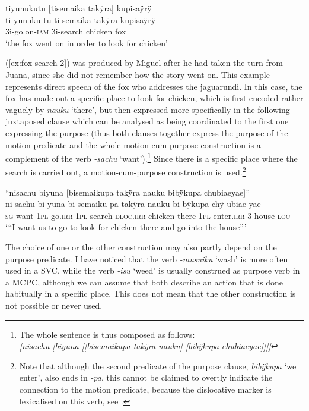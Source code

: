 \ea\label{ex:fox-search-1}
\begingl
\glpreamble tiyunukutu \textup{[}tisemaika takÿra\textup{]} kupisaÿrÿ\\
\gla ti-yunuku-tu ti-semaika takÿra kupisaÿrÿ\\
\glb 3i-go.on-\textsc{iam} 3i-search chicken fox\\
\glft ‘the fox went on in order to look for chicken’
\endgl
\trailingcitation{[jmx-n120429ls-x5.300]}
\xe

(\ref{ex:fox-search-2}) was produced by Miguel after he had taken the turn from Juana, since she did not remember how the story went on. This example represents direct speech of the fox who addresses the jaguarundi. In this case, the fox has made out a specific place to look for chicken, which is first encoded rather vaguely by \textit{nauku} ‘there’, but then expressed more specifically in the following juxtaposed clause which can be analysed as being coordinated to the first one expressing the purpose (thus both clauses together express the purpose of the motion predicate and the whole motion-cum-purpose construction is a complement of the verb \textit{-sachu} ‘want’).\footnote{The whole sentence is thus composed as follows:\\ \textit{\textup{[}nisachu \textup{[}biyuna \textup{[}\textup{[}bisemaikupa takÿra nauku\textup{]} \textup{[}bibÿkupa chubiaeyae\textup{]}\textup{]}\textup{]}\textup{]}}} Since there is a specific place where the search is carried out, a motion-cum-purpose construction is used.\footnote{Note that although the second predicate of the purpose clause, \textit{bibÿkupa} ‘we enter’, also ends in \textit{-pa}, this cannot be claimed to overtly indicate the connection to the motion predicate, because the dislocative marker is lexicalised on this verb, see .}


\ea\label{ex:fox-search-2}
\begingl
\glpreamble “nisachu biyuna \textup{[}bisemaikupa takÿra nauku bibÿkupa chubiaeyae\textup{]}”\\
\gla ni-sachu bi-yuna bi-semaiku-pa takÿra nauku bi-bÿkupa chÿ-ubiae-yae\\
\textsc{sg}-want 1\textsc{pl}-go.\textsc{irr} 1\textsc{pl}-search-\textsc{dloc.irr} chicken there 1\textsc{pl}-enter.\textsc{irr} 3-house-\textsc{loc}\\
\glft ‘“I want us to go to look for chicken there and go into the house”’
\endgl
\trailingcitation{[jmx-n120429ls-x5.321]}
\xe


The choice of one or the other construction may also partly depend on the purpose predicate. I have noticed that the verb \textit{-musuiku} ‘wash’ is more often used in a SVC, while the verb \textit{-isu} ‘weed’ is usually construed as purpose verb in a MCPC, although we can assume that both describe an action that is done habitually in a specific place. This does not mean that the other construction is not possible or never used.

